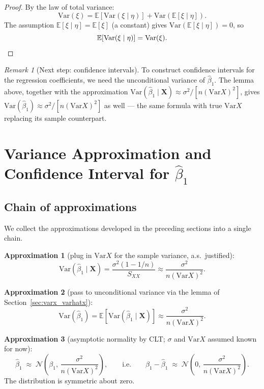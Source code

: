 \documentclass[a4paper,oneside,12pt]{extarticle}
\theoremstyle{plain}
\theoremstyle{definition}
\theoremstyle{remark}
\newtheorem{remark}[proposition]{Remark}
\newcommand*{\E}{\mathbb{E}}
\newcommand*{\Var}{\mathrm{Var}}
\begin{document}
\begin{proof}
By the law of total variance:
\[
  \Var(\xi)
  = \E\!\left[\Var(\xi\mid\eta)\right] + \Var\!\left(\E[\xi\mid\eta]\right).
\]
The assumption $\E[\xi\mid\eta] = \E[\xi]$ (a constant) gives
$\Var(\E[\xi\mid\eta]) = 0$, so
\[
  \E\!\left[\Var(\xi\mid\eta)\right] = \Var(\xi). \qedhere
\]
\end{proof}

\begin{remark}[Next step: confidence intervals]
To construct confidence intervals for the regression coefficients,
we need the unconditional variance of $\hat\beta_1$.  The lemma above,
together with the approximation
$\Var(\hat\beta_1\mid\mathbf{X})\approx \sigma^2/[n(\Var X)^2]$,
gives $\Var(\hat\beta_1)\approx \sigma^2/[n(\Var X)^2]$ as well ---
the same formula with true $\Var X$ replacing its sample counterpart.
\end{remark}

\section{Variance Approximation and Confidence Interval for
         \texorpdfstring{$\hat\beta_1$}{beta-hat\_1}}
\label{sec:var_approx_ci}

\subsection{Chain of approximations}

We collect the approximations developed in the preceding sections
into a single chain.

\textbf{Approximation 1} (plug in $\Var X$ for the sample variance,
a.s.\ justified):
\[
  \Var(\hat\beta_1 \mid \mathbf{X})
  = \frac{\sigma^2(1-1/n)}{S_{XX}}
  \approx \frac{\sigma^2}{n(\Var X)^2}.
\]

\textbf{Approximation 2} (pass to unconditional variance via the
lemma of Section~\ref{sec:varx_varhatx}):
\[
  \Var(\hat\beta_1)
  = \E\!\left[\Var(\hat\beta_1\mid\mathbf{X})\right]
  \approx \frac{\sigma^2}{n(\Var X)^2}.
\]

\textbf{Approximation 3} (asymptotic normality by CLT; $\sigma$ and
$\Var X$ assumed known for now):
\[
  \hat\beta_1 \;\approx\; \mathcal{N}\!\left(\beta_1,\,
    \frac{\sigma^2}{n(\Var X)^2}\right),
  \qquad\text{i.e.}\qquad
  \beta_1 - \hat\beta_1 \;\approx\;
  \mathcal{N}\!\left(0,\, \frac{\sigma^2}{n(\Var X)^2}\right).
\]
The distribution is symmetric about zero.
\end{document}
